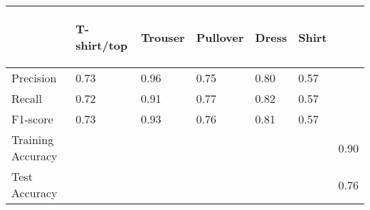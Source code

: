 \vspace{2em}
\begin{tabular}{lllllll}
&  \hspace{0.2em}\begin{rotate}{45} T-shirt/top \end{rotate}  &  \hspace{0.2em}\begin{rotate}{45} Trouser \end{rotate}  &  \hspace{0.2em}\begin{rotate}{45} Pullover \end{rotate}  &  \hspace{0.2em}\begin{rotate}{45} Dress \end{rotate}  &  \hspace{0.2em}\begin{rotate}{45} Shirt \end{rotate} \\
 \toprule
 Precision                       &                  0.73                  &                   0.96                    &                   0.75                   &                   0.80                   &                   0.57\\
 Recall                          &                  0.72                  &                   0.91                    &                   0.77                   &                   0.82                   &                   0.57\\
 F1-score &                  0.73                 &                   0.93                    &                   0.76                   &                   0.81                   &                   0.57\\
 \midrule
Training Accuracy & & & & & & 0.90\\
Test Accuracy & & & & & & 0.76\\

 \bottomrule
\end{tabular}
